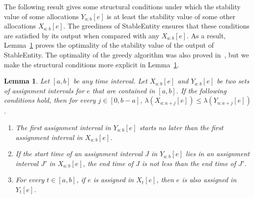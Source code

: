 \documentclass[11pt,a4paper]{article}
\renewcommand{\leq}{\leqslant}
\newtheorem{lemma}[theorem]{\bfseries{Lemma}}
\begin{document}
The following result gives some structural conditions under which the stability value of some allocations $Y_{a:b}[e]$ is at least the stability value of some other allocations $X_{a:b}[e]$.  The greediness of StableEntity ensures that these conditions are satisfied by its output when compared with any $X_{a:b}[e]$.  As a result, Lemma~\ref{lem:1} proves the optimality of the stability value of the output of StableEntity.  The optimality of the greedy algorithm was also proved in~\cite{BEM18}, but we make the structural conditions more explicit in Lemma~\ref{lem:1}.

\begin{lemma}
	\label{lem:1}
	Let $[a,b]$ be any time interval.  Let $X_{a:b}[e]$ and $Y_{a:b}[e]$ be two sets of assignment intervals for $e$ that are contained in $[a,b]$.  If the following conditions hold, then for every $j \in [0,b-a]$, $\lambda(X_{a:a+j}[e]) \leq \lambda(Y_{a:a+j}[e])$.
	\begin{enumerate}[{\em (i)}]
		\item The first assignment interval in $Y_{a:b}[e]$ starts no later than the first assignment interval in $X_{a:b}[e]$.
		\item If the start time of an assignment interval $J$ in $Y_{a:b}[e]$ lies in an assignment interval $J'$ in $X_{a:b}[e]$, the end time of $J$ is not less than the end time of $J'$.
		\item For every $t \in [a,b]$, if $e$ is assigned in $X_t[e]$, then $e$ is also assigned in $Y_t[e]$.
	\end{enumerate}
\end{lemma}
\end{document}
